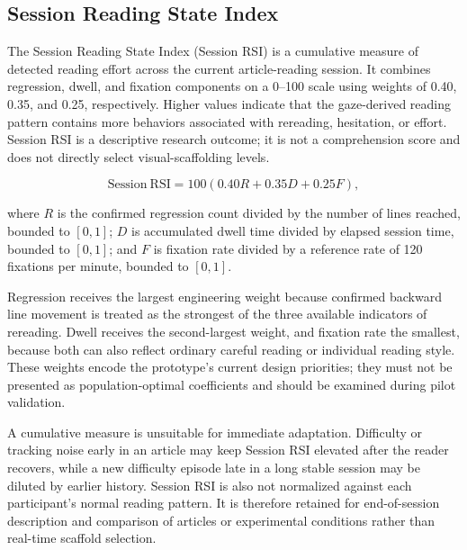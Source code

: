 %

\subsection{Session Reading State Index}

The Session Reading State Index (Session RSI) is a cumulative measure of
detected reading effort across the current article-reading session. It combines
regression, dwell, and fixation components on a 0--100 scale using weights of
0.40, 0.35, and 0.25, respectively. Higher values indicate that the gaze-derived
reading pattern contains more behaviors associated with rereading, hesitation,
or effort. Session RSI is a descriptive research outcome; it is not a
comprehension score and does not directly select visual-scaffolding levels.

\begin{equation}
  \mathrm{Session\ RSI}=100(0.40R+0.35D+0.25F),
\end{equation}

where \(R\) is the confirmed regression count divided by the number of lines
reached, bounded to \([0,1]\); \(D\) is accumulated dwell time divided by
elapsed session time, bounded to \([0,1]\); and \(F\) is fixation rate divided
by a reference rate of 120 fixations per minute, bounded to \([0,1]\).

Regression receives the largest engineering weight because confirmed backward
line movement is treated as the strongest of the three available indicators of
rereading. Dwell receives the second-largest weight, and fixation rate the
smallest, because both can also reflect ordinary careful reading or individual
reading style. These weights encode the prototype's current design priorities;
they must not be presented as population-optimal coefficients and should be
examined during pilot validation.

A cumulative measure is unsuitable for immediate adaptation. Difficulty or
tracking noise early in an article may keep Session RSI elevated after the
reader recovers, while a new difficulty episode late in a long stable session
may be diluted by earlier history. Session RSI is also not normalized against
each participant's normal reading pattern. It is therefore retained for
end-of-session description and comparison of articles or experimental
conditions rather than real-time scaffold selection.

